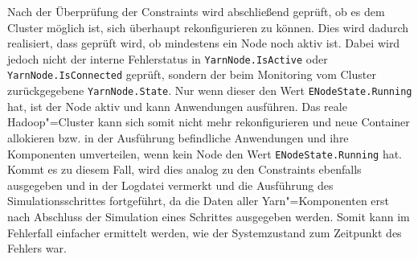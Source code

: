Nach der Überprüfung der Constraints wird abschließend geprüft, ob es dem Cluster möglich ist, sich überhaupt rekonfigurieren zu können.
Dies wird dadurch realisiert, dass geprüft wird, ob mindestens ein Node noch aktiv ist.
Dabei wird jedoch nicht der interne Fehlerstatus in \texttt{YarnNode.IsActive} oder \texttt{YarnNode.IsConnected} geprüft, sondern der beim Monitoring vom Cluster zurückgegebene \texttt{YarnNode.State}.
Nur wenn dieser den Wert \texttt{ENodeState.Running} hat, ist der Node aktiv und kann Anwendungen ausführen.
Das reale Hadoop"=Cluster kann sich somit nicht mehr rekonfigurieren und neue Container allokieren bzw. in der Ausführung befindliche Anwendungen und ihre Komponenten umverteilen, wenn kein Node den Wert \texttt{ENodeState.Running} hat.
Kommt es zu diesem Fall, wird dies analog zu den Constraints ebenfalls ausgegeben und in der Logdatei vermerkt und die Ausführung des Simulationsschrittes fortgeführt, da die Daten aller Yarn"=Komponenten erst nach Abschluss der Simulation eines Schrittes ausgegeben werden.
Somit kann im Fehlerfall einfacher ermittelt werden, wie der Systemzustand zum Zeitpunkt des Fehlers war.
